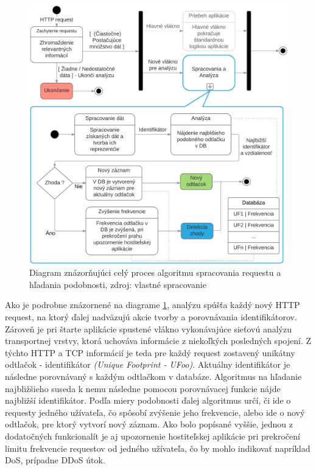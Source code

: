 \documentclass[
  digital, %
  table,   %
  lof,     %
  nolot,   %
  nocover
]{fithesis3}
\begin{document}
\begin{figure}[h]
  \centering
    \includegraphics[width=.93\textwidth]{images/footprint-hl.png}
  \caption{Diagram znázorňujúci celý proces algoritmu spracovania requestu a
  hľadania podobnosti, zdroj: vlastné spracovanie}
  \label{fig:footprint-hl}
\end{figure}

Ako je podrobne znázornené na diagrame \ref{fig:footprint-hl}, analýzu spúšťa každý nový
HTTP request, na ktorý ďalej nadväzujú akcie tvorby a porovnávania
identifikátorov. Zároveň je pri štarte aplikácie spustené vlákno vykonávajúce
sieťovú analýzu transportnej vrstvy, ktorá uchováva informácie z niekoľkých
posledných spojení. Z týchto HTTP a TCP informácií je teda pre každý request
zostavený unikátny odtlačok - identifikátor \textit{(Unique Footprint - UFoo)}.
Aktuálny identifikátor je následne porovnávaný s každým odtlačkom v databáze.
Algoritmus na hľadanie najbližšieho suseda k nemu následne pomocou porovnávacej
funkcie nájde najbližší identifikátor. Podľa miery podobnosti ďalej
algoritmus určí, či ide o requesty jedného užívateľa, čo spôsobí zvýšenie jeho
frekvencie, alebo ide o nový odtlačok, pre ktorý vytvorí nový záznam.
Ako bolo popísané vyššie, jednou z dodatočných funkcionalít je aj upozornenie hostiteľskej aplikácie pri
prekročení limitu frekvencie requestov od jedného užívateľa, čo by mohlo
indikovať napríklad DoS, prípadne DDoS útok.
\end{document}
